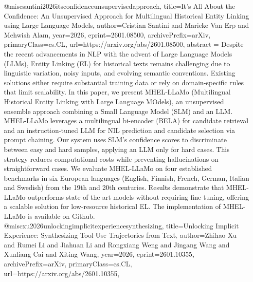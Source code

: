{}@misc{santini2026itsconfidenceunsupervisedapproach,
      title={It's All About the Confidence: An Unsupervised Approach for Multilingual Historical Entity Linking using Large Language Models}, 
      author={Cristian Santini and Marieke Van Erp and Mehwish Alam},
      year={2026},
      eprint={2601.08500},
      archivePrefix={arXiv},
      primaryClass={cs.CL},
      url={https://arxiv.org/abs/2601.08500},
      abstract = {Despite the recent advancements in NLP with the advent of Large Language Models (LLMs), Entity Linking (EL) for historical texts remains challenging due to linguistic variation, noisy inputs, and evolving semantic conventions. Existing solutions either require substantial training data or rely on domain-specific rules that limit scalability. In this paper, we present MHEL-LLaMo (Multilingual Historical Entity Linking with Large Language MOdels), an unsupervised ensemble approach combining a Small Language Model (SLM) and an LLM. MHEL-LLaMo leverages a multilingual bi-encoder (BELA) for candidate retrieval and an instruction-tuned LLM for NIL prediction and candidate selection via prompt chaining. Our system uses SLM's confidence scores to discriminate between easy and hard samples, applying an LLM only for hard cases. This strategy reduces computational costs while preventing hallucinations on straightforward cases. We evaluate MHEL-LLaMo on four established benchmarks in six European languages (English, Finnish, French, German, Italian and Swedish) from the 19th and 20th centuries. Results demonstrate that MHEL-LLaMo outperforms state-of-the-art models without requiring fine-tuning, offering a scalable solution for low-resource historical EL. The implementation of MHEL-LLaMo is available on Github.}
}@misc{xu2026unlockingimplicitexperiencesynthesizing,
      title={Unlocking Implicit Experience: Synthesizing Tool-Use Trajectories from Text}, 
      author={Zhihao Xu and Rumei Li and Jiahuan Li and Rongxiang Weng and Jingang Wang and Xunliang Cai and Xiting Wang},
      year={2026},
      eprint={2601.10355},
      archivePrefix={arXiv},
      primaryClass={cs.CL},
      url={https://arxiv.org/abs/2601.10355},
}
